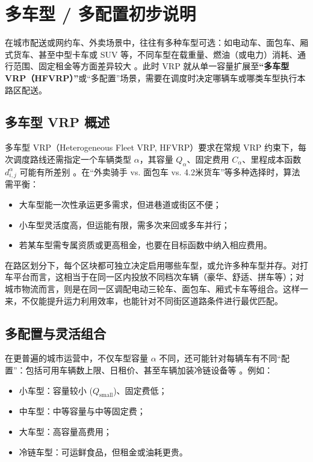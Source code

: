 \documentclass[12pt,a4paper,twoside]{ctexbook}
\begin{document}
\section{多车型 / 多配置初步说明}

在城市配送或网约车、外卖场景中，往往有多种车型可选：如电动车、面包车、厢式货车、甚至中型卡车或 SUV 等，不同车型在载重量、燃油（或电力）消耗、通行范围、固定租金等方面差异较大 \cite{baldacci2009unified}。此时 VRP 就从单一容量扩展至\textbf{“多车型 VRP（HFVRP）”}或“多配置”场景，需要在调度时决定哪辆车或哪类车型执行本路区配送。

\subsection{多车型 VRP 概述}
多车型 VRP（Heterogeneous Fleet VRP, HFVRP）要求在常规 VRP 约束下，每次调度路线还需指定一个车辆类型 $\alpha$，其容量 $Q_\alpha$、固定费用 $C_\alpha$、里程成本函数 $d_{i,j}^\alpha$ 可能有所差别 \cite{laporte2009fifty}。在“外卖骑手 vs. 面包车 vs. 4.2米货车”等多种选择时，算法需平衡：
\begin{itemize}
    \item 大车型能一次性承运更多需求，但进巷道或街区不便；
    \item 小车型灵活度高，但运能有限，需多次来回或多车并行；
    \item 若某车型需专属资质或更高租金，也要在目标函数中纳入相应费用。
\end{itemize}

在路区划分下，每个区块都可独立决定启用哪些车型，或允许多种车型并存。对打车平台而言，这相当于在同一区内投放不同档次车辆（豪华、舒适、拼车等）；对城市物流而言，则是在同一区调配电动三轮车、面包车、厢式卡车等组合。这样一来，不仅能提升运力利用效率，也能针对不同街区道路条件进行最优匹配。

\subsection{多配置与灵活组合}
在更普遍的城市运营中，不仅车型容量 $\alpha$ 不同，还可能针对每辆车有不同“配置”：包括可用车辆数上限、日租价、甚至车辆加装冷链设备等 \cite{salazaraguilar2013multi}。例如：
\begin{itemize}
    \item 小车型：容量较小 ($Q_{\text{small}}$)、固定费低；
    \item 中车型：中等容量与中等固定费；
    \item 大车型：高容量高费用；
    \item 冷链车型：可运鲜食品，但租金或油耗更贵。
\end{itemize}
\end{document}
